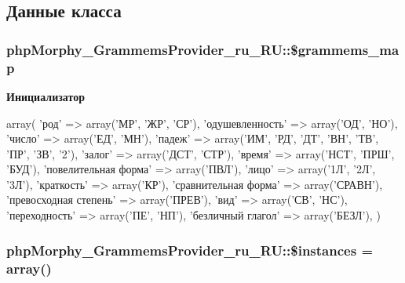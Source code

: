 \subsection{Данные класса}
\hypertarget{classphpMorphy__GrammemsProvider__ru__RU_a9b776427d1e20f10dbdb3a0bced975d5}{
\subsubsection[{\$grammems\_\-map}]{\setlength{\rightskip}{0pt plus 5cm}phpMorphy\_\-GrammemsProvider\_\-ru\_\-RU::\$grammems\_\-map}}
\label{classphpMorphy__GrammemsProvider__ru__RU_a9b776427d1e20f10dbdb3a0bced975d5}
{\bfseries Инициализатор}
\begin{DoxyCode}
 array( 
        'род' => array('МР', 'ЖР', 'СР'), 
        'одушевленность' => array('ОД', 'НО'), 
        'число' => array('ЕД', 'МН'), 
        'падеж' => array('ИМ', 'РД', 'ДТ', 'ВН', 'ТВ', 'ПР', 'ЗВ', '2'), 
        'залог' => array('ДСТ', 'СТР'), 
        'время' => array('НСТ', 'ПРШ', 'БУД'), 
        'повелительная форма' => array('ПВЛ'), 
        'лицо' => array('1Л', '2Л', '3Л'), 
        'краткость' => array('КР'), 
        'сравнительная форма' => array('СРАВН'), 
        'превосходная степень' => array('ПРЕВ'),
        'вид' => array('СВ', 'НС'),
        'переходность' => array('ПЕ', 'НП'),
        'безличный глагол' => array('БЕЗЛ'),
    )
\end{DoxyCode}
\hypertarget{classphpMorphy__GrammemsProvider__ru__RU_abc4de470d7089d6299a8a3d663bc1476}{
\subsubsection[{\$instances}]{\setlength{\rightskip}{0pt plus 5cm}phpMorphy\_\-GrammemsProvider\_\-ru\_\-RU::\$instances = array()}}
\label{classphpMorphy__GrammemsProvider__ru__RU_abc4de470d7089d6299a8a3d663bc1476}
